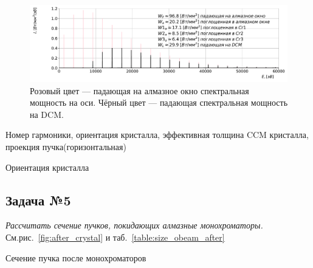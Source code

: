 \documentclass[14pt,a4paper]{extarticle}
\numberwithin{equation}{section}
\begin{document}
	\begin{figure}[h!]
		\centering  
		\includegraphics[width=\textwidth]{pic/spec.pdf}
		\caption{Розовый цвет --- падающая на алмазное окно спектральная мощность на оси. Чёрный цвет --- падающая спектральная мощность на DCM.}
		\label{fig:absorb_spec}
	\end{figure}

	\begin{table}[h!]
		\renewcommand*\dtlrealalign{S}
		\caption{Номер гармоники, ориентация кристалла, эффективная толщина CCM кристалла, проекция пучка(горизонтальная) }
		\centering
		\caption{Ориентация кристалла}
		\label{table:stable}
	\end{table}
	
	\subsection{Задача №5}
	\textit{Рассчитать сечение пучков, покидающих алмазные монохроматоры.}\\
	См.рис.~\ref{fig:after_crystal} и таб.~\ref{table:size_obeam_after}
	\begin{table}[h!]
		\renewcommand*\dtlrealalign{S}
		\caption{Сечение пучка после монохроматоров}
		\centering
		\label{table:size_obeam_after}
	\end{table}
	
\end{document}
